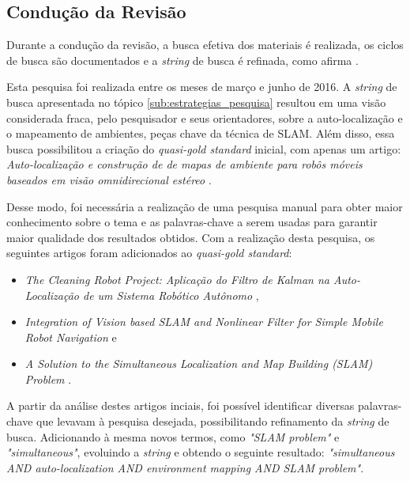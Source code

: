 
	\subsection{Condução da Revisão} %
	\label{sub:conducaoRevisao}

		Durante a condução da revisão, a busca efetiva dos materiais é realizada, os ciclos de busca são documentados e a \textit{string} de busca é refinada, como afirma \cite{estudoPrimarioSecundario}.

		Esta pesquisa foi realizada entre os meses de março e junho de 2016. A \textit{string} de busca apresentada no tópico \ref{sub:estrategias_pesquisa} resultou em uma visão considerada fraca, pelo pesquisador e seus orientadores, sobre a auto-localização e o mapeamento de ambientes, peças chave da técnica de SLAM. Além disso, essa busca possibilitou a criação do \textit{quasi-gold standard} inicial, com apenas um artigo: \textit{Auto-localização e construção de de mapas de ambiente para robôs móveis baseados em visão omnidirecional estéreo} \cite{localizacaoEMapeamentoPaulo}.

		Desse modo, foi necessária a realização de uma pesquisa manual para obter maior conhecimento sobre o tema e as palavras-chave a serem usadas para garantir maior qualidade dos resultados obtidos. Com a realização desta pesquisa, os seguintes artigos foram adicionados ao \textit{quasi-gold standard}:

		\begin{itemize}
			\item \textit{The Cleaning Robot Project: Aplicação do Filtro de Kalman na Auto-Localização de um Sistema Robótico Autônomo} \cite{theCleaningProject},
			\item \textit{Integration of Vision based SLAM and Nonlinear Filter for Simple Mobile Robot Navigation} \cite{integrationVisionSLAMnonlinear} e
			\item \textit{A Solution to the Simultaneous Localization and Map Building (SLAM) Problem} \cite{slamProblem}.
		\end{itemize}

		A partir da análise destes artigos inciais, foi possível identificar diversas palavras-chave que levavam à pesquisa desejada, possibilitando refinamento da \textit{string} de busca. Adicionando à mesma novos termos, como \textit{"SLAM problem"} e \textit{"simultaneous"}, evoluindo a \textit{string} e obtendo o seguinte resultado: \textit{"simultaneous AND auto-localization AND environment mapping AND SLAM problem"}.

